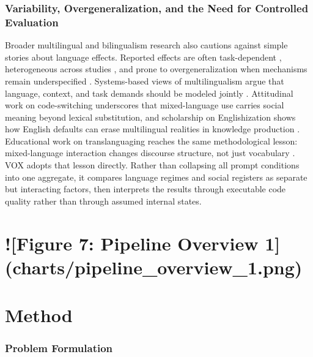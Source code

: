 \documentclass{article}
\begin{document}
\subsubsection{Variability, Overgeneralization, and the Need for Controlled Evaluation}

\label{sec:variability_overgeneralization_and_the_n}

Broader multilingual and bilingualism research also cautions against simple stories about language effects. Reported effects are often task-dependent \cite{bialystok2022bilingualism}, heterogeneous across studies \cite{ware2020metaanalysis}, and prone to overgeneralization when mechanisms remain underspecified \cite{leivada2020phantomlike}. Systems-based views of multilingualism argue that language, context, and task demands should be modeled jointly \cite{titone2022rethinking}. Attitudinal work on code-switching underscores that mixed-language use carries social meaning beyond lexical substitution, and scholarship on Englishization shows how English defaults can erase multilingual realities in knowledge production \cite{galloway2020internationalisation}. Educational work on translanguaging reaches the same methodological lesson: mixed-language interaction changes discourse structure, not just vocabulary \cite{cenoz2020teaching, wei2023transformative, gorter2020teachers}. VOX adopts that lesson directly. Rather than collapsing all prompt conditions into one aggregate, it compares language regimes and social registers as separate but interacting factors, then interprets the results through executable code quality rather than through assumed internal states.

\section{![Figure 7: Pipeline Overview 1](charts/pipeline\_overview\_1.png)}

\label{sec:figure_7_pipeline_overview_1_charts_pipe}

\section{Method}

\label{sec:method}

\subsubsection{Problem Formulation}

\label{sec:problem_formulation}
\end{document}
